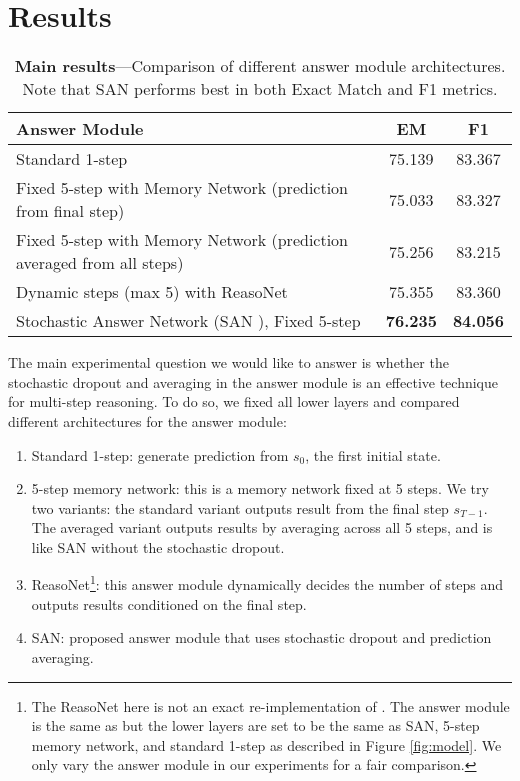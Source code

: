 \documentclass[11pt,a4paper]{article}
\newcommand\DR{SAN }
\begin{document}
\section{Results}
\begin{table*}[ht!]
\centering
\begin{tabular}{ l || c | c}
\hline
Answer Module	&EM&F1\\ \hline\hline
Standard 1-step &75.139 &83.367 \\ \hline
Fixed 5-step with Memory Network (prediction from final step) &75.033 & 83.327  \\ \hline
Fixed 5-step with Memory Network (prediction averaged from all steps) &75.256 & 83.215  \\ \hline
Dynamic steps (max 5) with ReasoNet & 75.355 &  83.360\\ \hline
Stochastic Answer Network (\DR), Fixed 5-step &\textbf{76.235}& {\textbf{84.056}} \\ \hline
\end{tabular}
\caption{\label{tab:model_comp} \textbf{Main results}---Comparison of different answer module architectures. Note that SAN performs best in both Exact Match and F1 metrics.} 
\end{table*}

The main experimental question we would like to answer is whether the stochastic dropout and averaging in the answer module is an effective technique for multi-step reasoning. 
To do so, we fixed all lower layers and compared different architectures for the answer module: 
\begin{enumerate}
\item Standard 1-step: generate prediction from $s_0$, the first initial state.
\item 5-step memory network: this is a memory network fixed at 5 steps. We try two variants: the standard variant outputs result from the final step $s_{T-1}$. The averaged variant outputs results by averaging across all 5 steps, and is like SAN without the stochastic dropout. 
\item ReasoNet\footnote{The ReasoNet here is not an exact re-implementation of \cite{shen2017empirical}. The answer module is the same as \cite{shen2017empirical} but the lower layers are set to be the same as SAN, 5-step memory network, and standard 1-step as described in Figure \ref{fig:model}. We only vary the answer module in our experiments for a fair comparison.}: this answer module dynamically decides the number of steps and outputs results conditioned on the final step.
\item SAN: proposed answer module that uses stochastic dropout and prediction averaging.
\end{enumerate}
\end{document}
